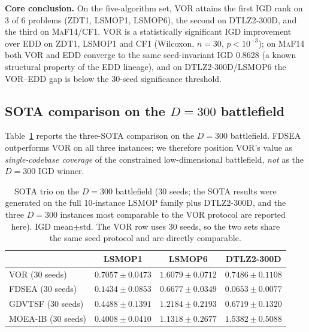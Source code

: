 \documentclass[preprint,12pt]{elsarticle}
\begin{document}
\textbf{Core conclusion.} On the five-algorithm set, \textsc{VOR}
attains the first IGD rank on 3 of 6 problems (\textsc{ZDT1},
\textsc{LSMOP1}, \textsc{LSMOP6}), the second on
\textsc{DTLZ2}-300D, and the third on \textsc{MaF14}/\textsc{CF1}.
\textsc{VOR} is a statistically significant IGD improvement over
\textsc{EDD} on \textsc{ZDT1}, \textsc{LSMOP1} and \textsc{CF1}
(Wilcoxon, $n=30$, $p<10^{-3}$); on \textsc{MaF14} both
\textsc{VOR} and \textsc{EDD} converge to the same seed-invariant
IGD 0.8628 (a known structural property of the \textsc{EDD} lineage),
and on \textsc{DTLZ2}-300D/\textsc{LSMOP6} the \textsc{VOR}--\textsc{EDD}
gap is below the 30-seed significance threshold.

\subsection{SOTA comparison on the $D=300$ battlefield}
\label{sec:sota}
Table~\ref{tab:sota} reports the three-SOTA comparison on the $D=300$
battlefield. \textsc{FDSEA} outperforms VOR on all three instances; we
therefore position VOR's value as \emph{single-codebase coverage} of the
constrained low-dimensional battlefield, \emph{not} as the $D=300$ IGD
winner.

\begin{table}[t]
\centering
\caption{SOTA trio on the $D=300$ battlefield (30 seeds; the SOTA
results were generated on the full 10-instance \textsc{LSMOP} family
plus \textsc{DTLZ2}-300D, and the three $D=300$ instances most
comparable to the \textsc{VOR} protocol are reported here).
IGD mean$\pm$std. The \textsc{VOR} row uses 30 seeds, so the two
sets share the same seed protocol and are directly comparable.}
\label{tab:sota}
\small
\begin{tabular}{lccc}
\toprule
 & \textsc{LSMOP1} & \textsc{LSMOP6} & \textsc{DTLZ2}-300D\\
\midrule
\textsc{VOR} (30 seeds) & $0.7057{\pm}0.0473$ & $1.6079{\pm}0.0712$ & $0.7486{\pm}0.1108$\\
\textsc{FDSEA} (30 seeds) & \textbf{$0.1434{\pm}0.0853$} & \textbf{$0.6677{\pm}0.0349$} & \textbf{$0.0653{\pm}0.0077$}\\
\textsc{GDVTSF} (30 seeds) & $0.4488{\pm}0.1391$ & $1.2184{\pm}0.2193$ & $0.6719{\pm}0.1320$\\
\textsc{MOEA-IB} (30 seeds) & $0.4008{\pm}0.0410$ & $1.1318{\pm}0.2677$
  & $1.5382{\pm}0.5088$\\
\bottomrule
\end{tabular}
\end{table}
\end{document}
